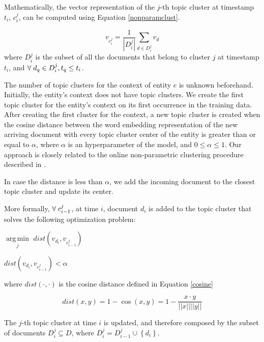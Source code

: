 \documentclass{article}
\DeclareMathOperator*{\argmin}{arg\,min}
\begin{document}
Mathematically, the vector representation of the $j$-th topic cluster at timestamp $t_i$, $c^j_i$, can be computed using Equation \ref{nonparamclust}.

\begin{equation}
\label{nonparamclust}
v_{c^j_i} = \frac{1}{|D^j_i|} \sum_{d \in D^j_i}{v_d}
\end{equation}
where $D^j_i$ is the subset of all the documents that belong to cluster $j$ at timestamp $t_i$, and $\forall\hspace{1mm}d_q \in D^j_i, t_q \leq t_i$.

The number of topic clusters for the context of entity $e$ is unknown beforehand. Initially, the entity's context does not have topic clusters. We create the first topic cluster for the entity's context on its first occurrence in the training data. After creating the first cluster for the context, a new topic cluster is created when the cosine distance between the word embedding representation of the new arriving document with every topic cluster center of the entity is greater than or equal to $\alpha$, where $\alpha$ is an hyperparameter of the model, and $0 \leq \alpha \leq 1$. Our approach is closely related to the online non-parametric clustering procedure described in \citet{Arvind14}.

In case the distance is less than $\alpha$, we add the incoming document to the closest topic cluster and update its center. 

More formally, $\forall\hspace{1mm}c^j_{i-1}$, at time $i$, document $d_i$ is added to the topic cluster that solves the following optimization problem:\\

\centerline{$\underset{j}{\argmin}$\;\; $dist(v_{d_i}, v_{c^j_{i-1}})$} 
\medskip
\centerline{ $dist(v_{d_i}, v_{c^j_{i-1}}) < \alpha$}

where $dist(\cdot,\cdot)$ is the cosine distance defined in Equation \ref{cosine}

\begin{equation}
\label{cosine}
dist(x,y) = 1 - \cos(x,y) = 1 - \frac{x \cdot y}{||x||||y||}
\end{equation}

The $j$-th topic cluster at time $i$ is updated, and therefore composed by the subset of documents $D^j_i \subseteq D$, where $D^j_i = D^j_{i-1} \cup \left\{ {d_i}\right\}$.
\end{document}
